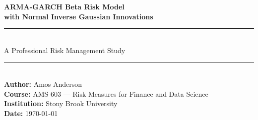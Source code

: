 \documentclass[12pt, a4paper]{article}
\begin{document}

\begin{titlepage}
\centering
\vspace*{1cm}


{\LARGE\bfseries\color{darkblue}
  ARMA-GARCH Beta Risk Model\\[0.4cm]
  with Normal Inverse Gaussian Innovations
}\\[1cm]

\rule{\textwidth}{1pt}\\[0.4cm]
{\large A Professional Risk Management Study}\\[0.4cm]
\rule{\textwidth}{1pt}\\[1.5cm]

{\large
  \textbf{Author:} Amos Anderson\\[0.3cm]
  \textbf{Course:} AMS 603 --- Risk Measures for Finance and 
  Data Science\\[0.3cm]
  \textbf{Institution:} Stony Brook University\\[0.3cm]
  \textbf{Date:} \today
}\\[2cm]

\begin{abstract}
\noindent
We construct, parameterise, and validate a professional-grade 
next-day equity risk model based on ARMA(1,1)-GARCH(1,1) filtering 
combined with Normal Inverse Gaussian (NIG) heavy-tailed innovation 
modelling. The model is assessed across five structurally distinct 
asset classes: the S\&P 500 index (\texttt{\^{}GSPC}), Apple Inc.\ 
(\texttt{AAPL}), the SPDR Gold ETF (\texttt{GLD}), the iShares TIPS 
ETF (\texttt{TIP}), and the EUR/USD exchange rate 
(\texttt{EURUSD=X}). Using a 250-period rolling estimation window 
over a 1,000-period assessment horizon (November 2021 -- December 
2025), we compute daily Value at Risk (VaR) and Conditional Value at 
Risk (CVaR) forecasts and subject them to four independent 
statistical tests: binomial backtesting, Kolmogorov-Smirnov, 
Anderson-Darling, and the Christoffersen independence test. The model 
passes binomial backtesting at both 95\% and 99\% confidence levels 
on all five asset classes simultaneously. NIG achieves 44--79\% lower 
Kolmogorov-Smirnov statistics relative to the Gaussian baseline 
across all assets, confirming the necessity of heavy-tailed modelling 
for accurate risk quantification.
\end{abstract}

\end{titlepage}
\end{document}
